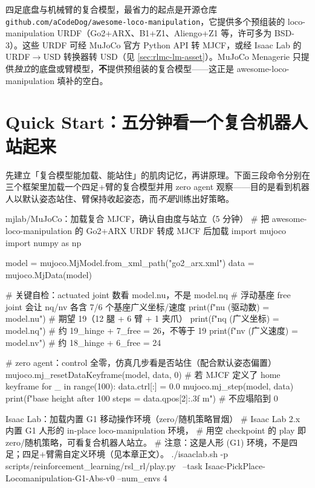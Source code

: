 \begin{note}
四足底盘与机械臂的复合模型，最省力的起点是开源仓库 \verb|github.com/aCodeDog/awesome-loco-manipulation|，它提供多个预组装的 loco-manipulation URDF（Go2+ARX、B1+Z1、Aliengo+Z1 等，许可多为 BSD-3）。这些 URDF 可经 MuJoCo 官方 Python API 转 MJCF，或经 Isaac Lab 的 URDF$\to$USD 转换器转 USD（见 \cref{sec:rlmc-lm-asset}）。MuJoCo Menagerie 只提供\emph{独立}的底盘或臂模型，\textbf{不}提供预组装的复合模型——这正是 awesome-loco-manipulation 填补的空白。
\end{note}

\section{Quick Start：五分钟看一个复合机器人站起来}
\label{sec:rlmc-lm-quickstart}

先建立「复合模型能加载、能站住」的肌肉记忆，再讲原理。下面三段命令分别在三个框架里加载一个四足+臂的复合模型并用 zero agent 观察——目的是看到机器人以默认姿态站住、臂保持收起姿态，而\emph{不是}训练出好策略。

\begin{codebox}[Python]{mjlab/MuJoCo：加载复合 MJCF，确认自由度与站立（5 分钟）}
# 把 awesome-loco-manipulation 的 Go2+ARX URDF 转成 MJCF 后加载
import mujoco
import numpy as np

model = mujoco.MjModel.from_xml_path("go2_arx.xml")
data = mujoco.MjData(model)

# 关键自检：actuated joint 数看 model.nu，不是 model.nq
# 浮动基座 free joint 会让 nq/nv 各含 7/6 个基座广义坐标/速度
print(f"nu (驱动数) = {model.nu}")           # 期望 19（12 腿 + 6 臂 + 1 夹爪）
print(f"nq (广义坐标) = {model.nq}")          # 约 19_hinge + 7_free = 26，不等于 19
print(f"nv (广义速度) = {model.nv}")          # 约 18_hinge + 6_free = 24

# zero agent：control 全零，仿真几步看是否站住（配合默认姿态偏置）
mujoco.mj_resetDataKeyframe(model, data, 0)   # 若 MJCF 定义了 home keyframe
for _ in range(100):
    data.ctrl[:] = 0.0
    mujoco.mj_step(model, data)
print(f"base height after 100 steps = {data.qpos[2]:.3f} m")  # 不应塌陷到 0
\end{codebox}

\begin{codebox}[bash]{Isaac Lab：加载内置 G1 移动操作环境（zero/随机策略冒烟）}
# Isaac Lab 2.x 内置 G1 人形的 in-place loco-manipulation 环境，
# 用空 checkpoint 的 play 即 zero/随机策略，可看复合机器人站立。
# 注意：这是人形 (G1) 环境，不是四足；四足+臂需自定义环境（见本章正文）。
./isaaclab.sh -p scripts/reinforcement_learning/rsl_rl/play.py \
  --task Isaac-PickPlace-Locomanipulation-G1-Abs-v0 --num_envs 4
\end{codebox}

